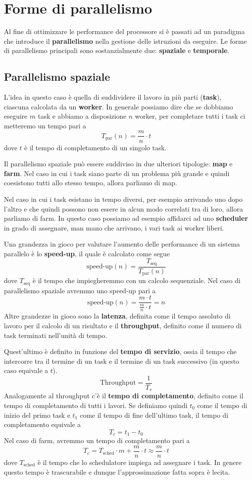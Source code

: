 \chapter{Forme di parallelismo}
Al fine di ottimizzare le performance del processore si è passati ad un paradigma che introduce il
\textbf{parallelismo} nella gestione delle istruzioni da eseguire. Le forme di parallelismo
principali sono sostanzialmente due: \textbf{spaziale} e \textbf{temporale}.

\section{Parallelismo spaziale}
L'idea in questo caso è quella di suddividere il lavoro in più parti (\textbf{task}), ciascuna
calcolata da un \textbf{worker}. In generale possiamo dire che se dobbiamo eseguire $m$ task e
abbiamo a disposizione $n$ worker, per completare tutti i task ci metteremo un tempo pari a
\[ T_\text{par} (n) = \frac{m}{n} \cdot t \]
dove $t$ è il tempo di completamento di un singolo task.

Il parallelismo spaziale può essere suddiviso in due ulteriori tipologie: \textbf{map} e
\textbf{farm}. Nel caso in cui i task siano parte di un problema più grande e quindi coesistono
tutti allo stesso tempo, allora parliamo di map.

Nel caso in cui i task esistano in tempo diversi, per esempio arrivando uno dopo l'altro e che
quindi possono non essere in alcun modo correlati tra di loro, allora parliamo di farm. In questo
caso possiamo ad esempio affidarci ad uno \textbf{scheduler} in grado di assegnare, man mano che
arrivano, i vari task ai worker liberi.

Una grandezza in gioco per valutare l'aumento delle performance di un sistema parallelo è lo
\textbf{speed-up}, il quale è calcolato come segue
\[ \text{speed-up} (n) = \frac{T_\text{seq}}{T_\text{par} (n)} \]
dove $T_\text{seq}$ è il tempo che impiegheremmo con un calcolo sequenziale. Nel caso di
parallelismo spaziale avremmo uno speed-up pari a
\[ \text{speed-up} (n) = \frac{m \cdot t}{\frac{m}{n} \cdot t} = n \]
Altre grandezze in gioco sono la \textbf{latenza}, definita come il tempo assoluto di lavoro per il
calcolo di un risultato e il \textbf{throughput}, definito come il numero di task terminati
nell'unità di tempo.

Quest'ultimo è definito in funzione del \textbf{tempo di servizio}, ossia il tempo che intercorre
tra il termine di un task e il termine di un task successivo (in questo caso equivale a $t$).
\[ \text{Throughput} = \frac{1}{T_s} \]
Analogamente al throughput c'è il \textbf{tempo di completamento}, definito come il tempo di
completamento di tutti i lavori. Se definiamo quindi $t_0$ come il tempo di inizio del primo task
e $t_1$ come il tempo di fine dell'ultimo task, il tempo di completamento equivale a
\[ T_c = t_1 - t_0 \]
Nel caso di farm, avremmo un tempo di completamento pari a
\[ T_c = T_\text{sched} \cdot m + \frac{m}{n} \cdot t \approx \frac{m}{n} \cdot t \]
dove $T_\text{sched}$ è il tempo che lo schedulatore impiega ad assegnare i task. In genere questo
tempo è trascurabile e dunque l'approssimazione fatta sopra è lecita.

